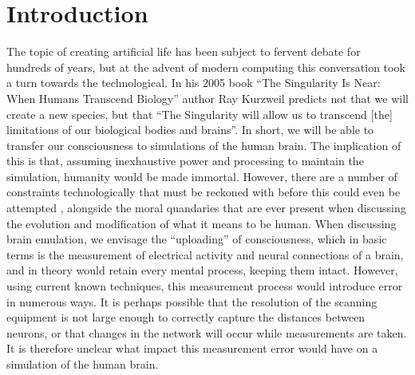 \chapter{Introduction}

The topic of creating artificial life has been subject to fervent debate for hundreds of years, but at the advent of modern computing this conversation took a turn towards the technological. In his 2005 book “The Singularity Is Near: When Humans Transcend Biology” author Ray Kurzweil predicts not that we will create a new species, but that “The Singularity will allow us to transcend [the] limitations of our biological bodies and brains”\parencite{kurzweil_singularity_2006}. 
In short, we will be able to transfer our consciousness to simulations of the human brain. The implication of this is that, assuming inexhaustive power and processing to maintain the simulation, humanity would be made immortal. However, there are a number of constraints technologically that must be reckoned with before this could even be attempted \parencite{bostrom_whole_2008}, alongside the moral quandaries that are ever present when discussing the evolution and modification of what it means to be human. When discussing brain emulation, we envisage the “uploading” of consciousness, which in basic terms is the measurement of electrical activity and neural connections of a brain, and in theory would retain every mental process, keeping them intact. However, using current known techniques, this measurement process would introduce error in numerous ways. It is perhaps possible that the resolution of the scanning equipment is not large enough to correctly capture the distances between neurons, or that changes in the network will occur while measurements are taken. It is therefore unclear what impact this measurement error would have on a simulation of the human brain.